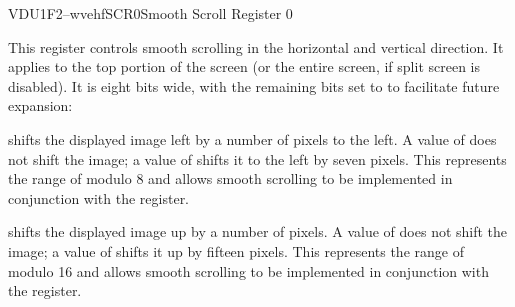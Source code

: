 


\begin{ioport}{VDU}{1F2}{--wvehf}{SCR0}{Smooth Scroll Register 0}

  This register controls smooth scrolling in the horizontal and vertical
  direction. It applies to the top portion of the screen (or the entire screen,
  if split screen is disabled). It is eight bits wide, with the remaining bits
  set to  to facilitate future expansion:

  \begin{bitfield}
  \end{bitfield}

  \begin{description}
     shifts the displayed image left by a number of
    pixels to the left. A value of  does not shift the image; a value of
     shifts it to the left by seven pixels. This represents the range of
    modulo 8 and allows smooth scrolling to be implemented in conjunction with
    the  register.

     shifts the displayed image up by a number of pixels. A
    value of  does not shift the image; a value of  shifts it up
    by fifteen pixels. This represents the range of modulo 16 and allows smooth
    scrolling to be implemented in conjunction with the  register.
  \end{description}

\end{ioport}





